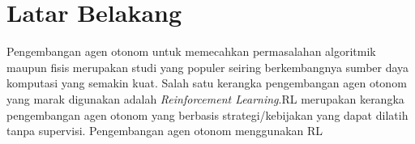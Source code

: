 \section{Latar Belakang}

\begin{singlespace}
Pengembangan agen otonom untuk memecahkan permasalahan algoritmik maupun
fisis merupakan studi yang populer seiring berkembangnya sumber daya komputasi
yang semakin kuat. Salah satu kerangka pengembangan agen otonom yang marak
digunakan adalah \textit{Reinforcement Learning}.\ac{RL} 
merupakan kerangka pengembangan agen otonom yang berbasis strategi/kebijakan
yang dapat dilatih tanpa supervisi. Pengembangan agen otonom menggunakan \ac{RL}
\end{singlespace}
